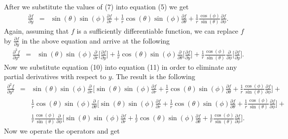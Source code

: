 \documentclass[12pt]{article}
\begin{document}
After we substitute the values of (7) into equation (5) we get
\begin{eqnarray}
\frac{\partial f}{\partial y} &=& \sin(\theta)\sin(\phi)\frac{\partial f}{\partial r} + \frac{1}{r}\cos(\theta)\sin(\phi)\frac{\partial f}{\partial\theta} + \frac{1}{r}\frac{\cos(\phi)}{\sin(\theta)}\frac{\partial f}{\partial\phi}.
\end{eqnarray}
Again, assuming that $f$ is a sufficiently differentiable function, we can replace $f$ by $\frac{\partial f}{\partial y}$ in the above equation and arrive at the following
\begin{eqnarray}
\frac{{\partial}^2 f}{\partial y^2} &=& \sin(\theta)\sin(\phi)\frac{\partial}{\partial r}\Big[\frac{\partial f}{\partial y}\Big] + \frac{1}{r}\cos(\theta)\sin(\phi)\frac{\partial}{\partial\theta}\Big[\frac{\partial f}{\partial y}\Big] + \frac{1}{r}\frac{\cos(\phi)}{\sin(\theta)}\frac{\partial}{\partial\phi}\Big[\frac{\partial f}{\partial y}\Big].
\end{eqnarray}
Now we substitute equation (10) into equation (11) in order to eliminate any partial derivatives with respect to $y$. The result is the following
\begin{eqnarray*}
\frac{{\partial}^2 f}{\partial y^2} &=& \sin(\theta)\sin(\phi)\frac{\partial}{\partial r}\Big[\sin(\theta)\sin(\phi)\frac{\partial f}{\partial r} + \frac{1}{r}\cos(\theta)\sin(\phi)\frac{\partial f}{\partial\theta} + \frac{1}{r}\frac{\cos(\phi)}{\sin(\theta)}\frac{\partial f}{\partial\phi}\Big] + \\
& & \frac{1}{r}\cos(\theta)\sin(\phi)\frac{\partial}{\partial\theta}\Big[\sin(\theta)\sin(\phi)\frac{\partial f}{\partial r} + \frac{1}{r}\cos(\theta)\sin(\phi)\frac{\partial f}{\partial\theta} + \frac{1}{r}\frac{\cos(\phi)}{\sin(\theta)}\frac{\partial f}{\partial\phi}\Big] + \\
& & \frac{1}{r}\frac{\cos(\phi)}{\sin(\theta)}\frac{\partial}{\partial\phi}\Big[\sin(\theta)\sin(\phi)\frac{\partial f}{\partial r} + \frac{1}{r}\cos(\theta)\sin(\phi)\frac{\partial f}{\partial\theta} + \frac{1}{r}\frac{\cos(\phi)}{\sin(\theta)}\frac{\partial f}{\partial\phi}\Big].
\end{eqnarray*}
Now we operate the operators and get
\end{document}
